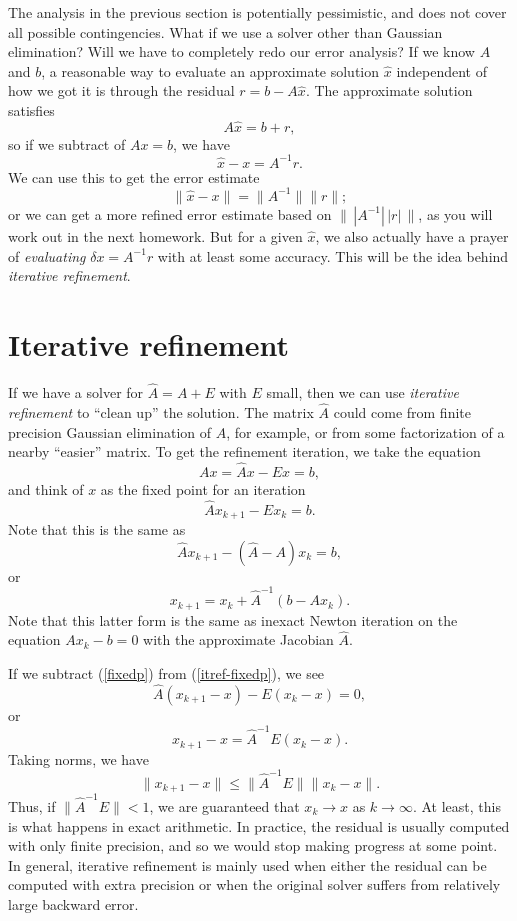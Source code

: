 \documentclass[12pt, leqno]{article}
\begin{document}
The analysis in the previous section is potentially pessimistic, and
does not cover all possible contingencies.  What if we use a solver
other than Gaussian elimination?  Will we have to completely redo our
error analysis?  If we know $A$ and $b$, a reasonable way to evaluate
an approximate solution $\hat{x}$ independent of how we got it is
through the residual $r = b-A\hat{x}$.  The approximate solution
satisfies
\[
  A \hat{x} = b + r,
\]
so if we subtract of $Ax = b$, we have
\[
  \hat{x}-x = A^{-1} r.
\]
We can use this to get the error estimate
\[
  \|\hat{x}-x\| = \|A^{-1}\| \|r\|;
\]
or we can get a more refined error estimate based on $\| \, |A^{-1}|
\, |r| \, \|$, as you will work out in the next homework.  But for a
given $\hat{x}$, we also actually have a prayer of {\em evaluating}
$\delta x = A^{-1} r$ with at least some accuracy.  This will be the
idea behind {\em iterative refinement}.

\section*{Iterative refinement}

If we have a solver for $\hat{A} = A + E$ with $E$ small, then we can
use {\em iterative refinement} to ``clean up'' the solution.  The
matrix $\hat{A}$ could come from finite precision Gaussian elimination
of $A$, for example, or from some factorization of a nearby ``easier''
matrix.  To get the refinement iteration, we take the equation
\begin{equation} \label{fixedp}
  Ax = \hat{A}x-Ex = b,
\end{equation}
and think of $x$ as the fixed point for an iteration
\begin{equation} \label{itref-fixedp}
  \hat{A} x_{k+1} - E x_k = b.
\end{equation}
Note that this is the same as
\[
  \hat{A} x_{k+1} - (\hat{A} - A) x_k = b,
\]
or
\[
  x_{k+1} = x_k + \hat{A}^{-1} (b - A x_{k}).
\]
Note that this latter form is the same as inexact Newton iteration on 
the equation $A x_{k} - b = 0$ with the approximate Jacobian $\hat{A}$.

If we subtract (\ref{fixedp}) from (\ref{itref-fixedp}), we see
\[
  \hat{A}(x_{k+1}-x) - E(x_k-x) = 0,
\]
or
\[
  x_{k+1}-x = \hat{A}^{-1} E (x_k-x).
\]
Taking norms, we have
\[
  \|x_{k+1}-x\| \leq \|\hat{A}^{-1} E\| \|x_k-x\|.
\]
Thus, if $\|\hat{A}^{-1} E\| < 1$, we are guaranteed that $x_{k} \rightarrow x$
as $k \rightarrow \infty$.  At least, this is what happens in exact arithmetic.
In practice, the residual is usually computed with only finite precision,
and so we would stop making progress at some point.  In general,
iterative refinement is mainly used when either the residual can be
computed with extra precision or when the original solver suffers from
relatively large backward error.
\end{document}
